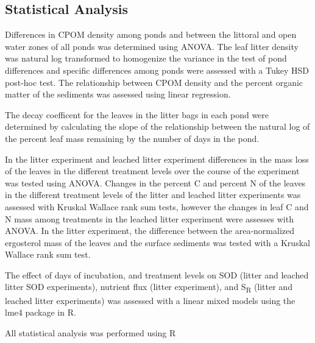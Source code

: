 \subsection{Statistical Analysis}

Differences in CPOM density among ponds and between the littoral and open water zones of all ponds was determined using ANOVA. The leaf litter density was natural log transformed to homogenize the variance in the test of pond differences and specific differences among ponds were assessed with a Tukey HSD post-hoc test. The relationship between CPOM density and the percent organic matter of the sediments was assessed using linear regression.

The decay coefficent for the leaves in the litter bags in each pond were determined by calculating the slope of the relationship between the natural log of the percent leaf mass remaining by the number of days in the pond.

In the litter experiment and leached litter experiment differences in the mass loss of the leaves in the different treatment levels over the course of the experiment was tested using ANOVA. Changes in the percent C and percent N of the leaves in the different treatment levels of the litter and leached litter experiments was assessed with Kruskal Wallace rank sum tests, however the changes in leaf C and N mass among treatments in the leached litter experiment were assesses with ANOVA. In the litter experiment, the difference between the area-normalized ergosterol mass of the leaves and the surface sediments was tested with a Kruskal Wallace rank sum test.

The effect of days of incubation, and treatment levels on SOD (litter and leached litter SOD experiments), nutrient flux (litter experiment), and S\textsubscript{R} (litter and leached litter experiments) was assessed with a linear mixed models using the lme4 package \cite{lme4} in R.

All statistical analysis was performed using R \cite{R}


